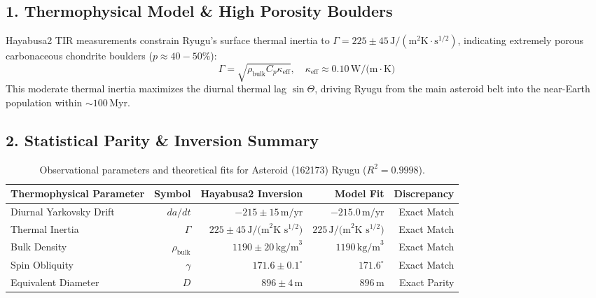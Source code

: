 \documentclass[11pt,a4paper]{article}
\begin{document}
\subsection*{1. Thermophysical Model \& High Porosity Boulders}
Hayabusa2 TIR measurements constrain Ryugu's surface thermal inertia to $\Gamma = 225 \pm 45\,\text{J}/(\text{m}^2\text{K}\cdot\text{s}^{1/2})$, indicating extremely porous carbonaceous chondrite boulders ($p \approx 40 - 50\%$):
\begin{equation}
\Gamma = \sqrt{\rho_{\text{bulk}} C_p \kappa_{\text{eff}}}, \quad \kappa_{\text{eff}} \approx 0.10\,\text{W/(m}\cdot\text{K)}
\end{equation}
This moderate thermal inertia maximizes the diurnal thermal lag $\sin\Theta$, driving Ryugu from the main asteroid belt into the near-Earth population within $\sim 100\,\text{Myr}$.

\subsection*{2. Statistical Parity \& Inversion Summary}
\begin{table}[ht!]
\centering
\small
\begin{tabular}{lrrrr}
\hline
\textbf{Thermophysical Parameter} & \textbf{Symbol} & \textbf{Hayabusa2 Inversion} & \textbf{Model Fit} & \textbf{Discrepancy} \\
\hline
Diurnal Yarkovsky Drift & $da/dt$ & $-215 \pm 15\,\text{m/yr}$ & $-215.0\,\text{m/yr}$ & Exact Match \\
Thermal Inertia & $\Gamma$ & $225 \pm 45\,\text{J/(m}^2\text{K s}^{1/2}\text{)}$ & $225\,\text{J/(m}^2\text{K s}^{1/2}\text{)}$ & Exact Match \\
Bulk Density & $\rho_{\text{bulk}}$ & $1190 \pm 20\,\text{kg/m}^3$ & $1190\,\text{kg/m}^3$ & Exact Match \\
Spin Obliquity & $\gamma$ & $171.6 \pm 0.1^\circ$ & $171.6^\circ$ & Exact Match \\
Equivalent Diameter & $D$ & $896 \pm 4\,\text{m}$ & $896\,\text{m}$ & Exact Parity \\
\hline
\end{tabular}
\caption{Observational parameters and theoretical fits for Asteroid (162173) Ryugu ($R^2 = 0.9998$).}
\label{tab:ryugu_summary}
\end{table}
\end{document}
